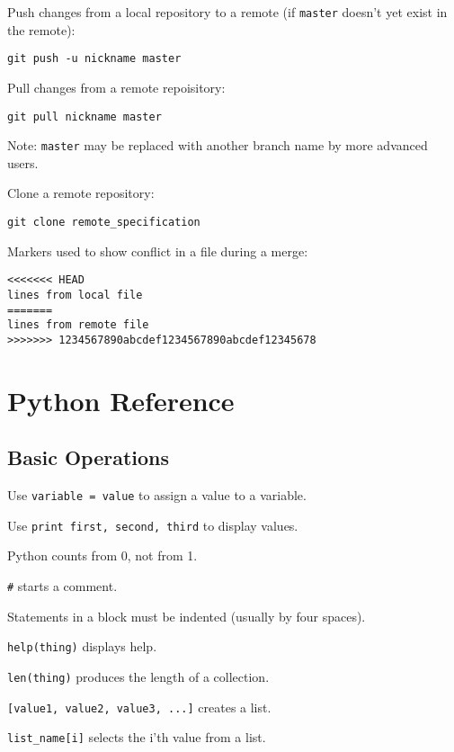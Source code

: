 Push changes from a local repository to a remote (if \texttt{master}
doesn't yet exist in the remote):

\begin{Verbatim}
git push -u nickname master
\end{Verbatim}

Pull changes from a remote repoisitory:

\begin{Verbatim}
git pull nickname master
\end{Verbatim}

Note: \texttt{master} may be replaced with another branch name by more
advanced users.

Clone a remote repository:

\begin{Verbatim}
git clone remote_specification
\end{Verbatim}

Markers used to show conflict in a file during a merge:

\begin{Verbatim}
<<<<<<< HEAD
lines from local file
=======
lines from remote file
>>>>>>> 1234567890abcdef1234567890abcdef12345678
\end{Verbatim}

\section{Python Reference}

\subsection*{Basic Operations}

\begin{swcitemize}
\item
  Use \texttt{variable = value} to assign a value to a variable.
\item
  Use \texttt{print first, second, third} to display values.
\item
  Python counts from 0, not from 1.
\item
  \texttt{\#} starts a comment.
\item
  Statements in a block must be indented (usually by four spaces).
\item
  \texttt{help(thing)} displays help.
\item
  \texttt{len(thing)} produces the length of a collection.
\item
  \texttt{{[}value1, value2, value3, ...{]}} creates a list.
\item
  \texttt{list\_name{[}i{]}} selects the i'th value from a list.
\end{swcitemize}

